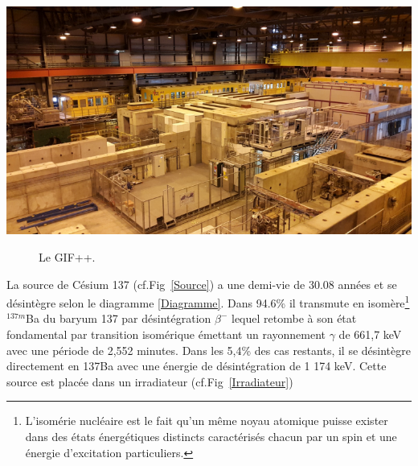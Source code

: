 \marginpar
{
	\centering
	\includegraphics[width=\marginparwidth]{GLA/GIF2.png}
	\label{GIF2}
}

\begin{figure}[ht!]
	\centering
	\hfill
	\caption{Le GIF++.}
	\label{GIF}
\end{figure}


La source de Césium 137 (cf.Fig~\ref{Source}) a une demi-vie de 30.08 années et se désintègre selon le diagramme \ref{Diagramme}. Dans 94.6\% il transmute en isomère\footnote{L’isomérie nucléaire est le fait qu'un même noyau atomique puisse exister dans des états énergétiques distincts caractérisés chacun par un spin et une énergie d'excitation particuliers.} $^{137m}$Ba du baryum 137 par désintégration $\beta^{-}$ lequel retombe à son état fondamental par transition isomérique émettant un rayonnement $\gamma$ de 661,7 keV avec une période de 2,552 minutes. Dans les 5,4\% des cas restants, il se désintègre directement en 137Ba avec une énergie de désintégration de 1 174 keV. Cette source est placée dans un irradiateur (cf.Fig~\ref{Irradiateur})

